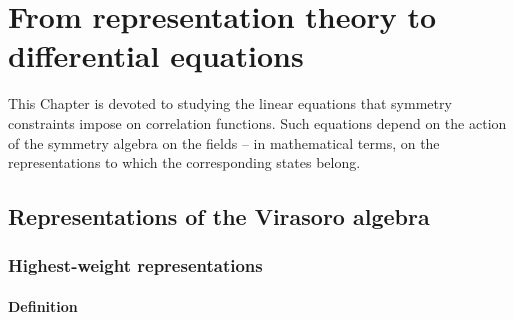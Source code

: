 \documentclass[12pt, a4paper, notitlepage, twoside]{report}
\numberwithin{equation}{section}
\theoremstyle{break}
\begin{document}
\chapter{From representation theory to differential equations \label{secccs}}

This Chapter is devoted to studying the linear equations that symmetry constraints impose on correlation functions.
Such equations depend on the action of the symmetry algebra on the fields -- in mathematical terms, on the representations to which the corresponding states belong. 

\section{Representations of the Virasoro algebra \label{secrep}}

\subsection{Highest-weight representations}

\subsubsection{Definition}
\end{document}
